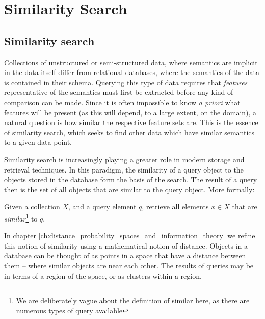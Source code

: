 \chapter{Similarity Search}\label{ch:similarity_search}
 \section{Similarity search}
Collections of unstructured or semi-structured data, where semantics are implicit in the data itself differ from relational databases, where the semantics of the data is contained in their schema.  Querying this type of data requires that \textit{features} representative of the semantics must first be extracted before any kind of comparison can be made.  Since it is often impossible to know \textit{a priori} what features will be present (as this will depend, to a large extent, on the domain), a natural question is how similar the respective feature sets are.  This is the essence of similarity search, which seeks to find other data which have similar semantics to a given data point.

Similarity search is increasingly playing a greater role in modern storage and retrieval techniques. In this paradigm, the similarity of a query object to the objects stored in the database form the basis of the search. 
The result of a query then is the set of all objects that are similar to the query object.
More formally:
%
\begin{mydef} 
Given a collection $X$, and a query element $q$, retrieve all elements $x \in X$ that are \textit{similar}\footnote{We are deliberately vague about the definition of similar here, as there are numerous types of query available} to $q$. 
\end{mydef}
%
In chapter \ref{ch:distance_probability_spaces_and_information_theory} we refine this notion of similarity using a mathematical notion of distance.
Objects in a database can be thought of as points in a space that have a distance between them -- where similar objects are near each other.  The results of queries may be in terms of a region of the space, or as clusters within a region.  

